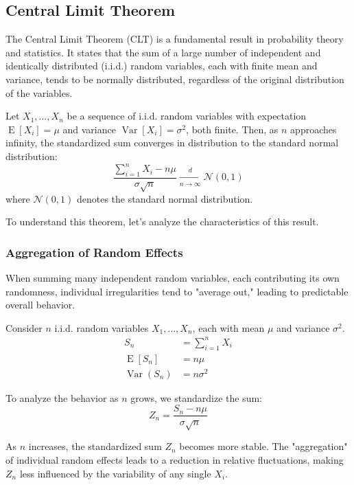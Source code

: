 \documentclass[11pt, headings=standardclasses, parskip=half, twoside]{scrartcl}
\begin{document}
\subsection{Central Limit Theorem}

The Central Limit Theorem (CLT) is a fundamental result in probability theory and statistics. It states that the sum of a large number of independent and identically distributed (i.i.d.) random variables, each with finite mean and variance, tends to be normally distributed, regardless of the original distribution of the variables.

\begin{theorem}{}
    \label{thm:clt}
    Let $X_{1}, \ldots, X_{n}$ be a sequence of i.i.d. random variables with expectation $\operatorname{E}[X_{i}]=\mu$ and variance $\operatorname{Var}[X_{i}]=\sigma^{2}$, both finite.
    Then, as $n$ approaches infinity, the standardized sum converges in distribution to the standard normal distribution:
    \[
    \frac{\sum_{i=1}^{n} X_{i}-n \mu}{\sigma \sqrt{n}} \xrightarrow[n \rightarrow \infty]{d} \mathcal{N}(0,1)
    \]
    where $\mathcal{N}(0,1)$ denotes the standard normal distribution.
\end{theorem}


To understand this theorem, let's analyze the characteristics of this result.

\subsubsection{Aggregation of Random Effects}
When summing many independent random variables, each contributing its own randomness, individual irregularities tend to "average out," leading to predictable overall behavior.

Consider $n$ i.i.d. random variables $X_{1}, \ldots, X_{n}$, each with mean $\mu$ and variance $\sigma^{2}$.
\[
\begin{aligned}
S_{n} &= {\textstyle \sum_{i=1}^{n}} X_{i} \\ %
\operatorname{E}[S_{n}] &=n \mu \\
\operatorname{Var}(S_{n}) &=n \sigma^{2}
\end{aligned}
\]

To analyze the behavior as $n$ grows, we standardize the sum:
\[
Z_{n}=\frac{S_{n}-n \mu}{\sigma \sqrt{n}}
\]

As $n$ increases, the standardized sum $Z_{n}$ becomes more stable. The "aggregation" of individual random effects leads to a reduction in relative fluctuations, making $Z_{n}$ less influenced by the variability of any single $X_{i}$.
\end{document}

